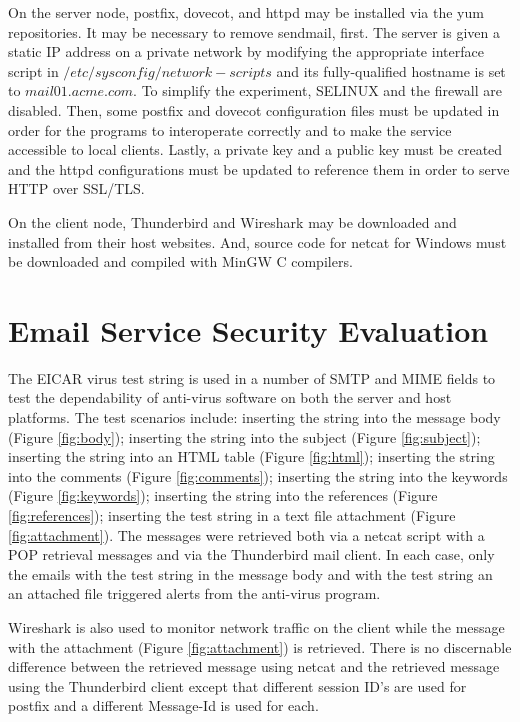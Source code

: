\documentclass[10pt,conference]{IEEEtran}
\begin{document}
On the server node, postfix, dovecot, and httpd may be installed via the yum repositories. It may
be necessary to remove sendmail, first. The server is given a static IP address on a private network
by modifying the appropriate interface script in $/etc/sysconfig/network-scripts$ and its fully-qualified
hostname is set to $mail01.acme.com$. To simplify the experiment, SELINUX and the firewall are 
disabled. Then, some postfix and dovecot configuration files must be updated\cite{centos:email:sk} 
in order for the programs to interoperate correctly and to make the service accessible to local clients.
Lastly, a private key and a public key must be created and the httpd configurations must be updated to 
reference them in order to serve HTTP over SSL/TLS\cite{centos:http:cg}.

On the client node, Thunderbird\cite{windows:thunderbird} and Wireshark\cite{windows:wireshark} may
be downloaded and installed from their host websites.
And, source code for netcat for Windows\cite{windows:netcat:jc} must be downloaded and compiled
with MinGW\cite{windows:mingw} C compilers.

\section{Email Service Security Evaluation}
The EICAR virus\cite{windows:eicar} test string is used in a number of SMTP
and MIME fields to test the dependability of anti-virus software on both the server and host platforms.
The test scenarios include: inserting the string into the message body (Figure \ref{fig:body}); inserting the string into the subject
(Figure \ref{fig:subject});
inserting the string into an HTML table (Figure \ref{fig:html}); inserting the string into the comments (Figure \ref{fig:comments});  inserting the string into the
keywords (Figure \ref{fig:keywords}); inserting the string into the references (Figure \ref{fig:references}); inserting the test string in a text file attachment
(Figure \ref{fig:attachment}).
The messages were retrieved both via a netcat script with a POP retrieval messages and via the Thunderbird mail client.
In each case, only the emails with the test string in the message body and with the test string an an attached file triggered
alerts from the anti-virus program.

Wireshark is also used to monitor network traffic on the client while the message with the attachment (Figure \ref{fig:attachment}) is retrieved. There is no discernable
difference between the retrieved message using netcat and the retrieved message using the Thunderbird client except that different session ID's 
are used for postfix and a different Message-Id is used for each.
\end{document}
